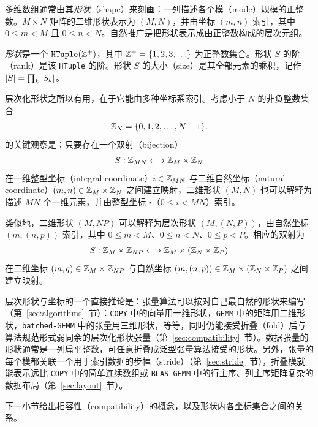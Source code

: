 \label{sec:shape}

多维数组通常由其\emph{形状}（shape）来刻画：一列描述各个模（mode）规模的正整数。$M{\times}N$ 矩阵的二维形状表示为 $(M,N)$，并由坐标 $(m,n)$ 索引，其中 $0 \leq m < M$ 且 $0 \leq n < N$。自然推广是把形状表示成由正整数构成的层次元组。

\begin{definition}
\emph{形状}是一个 $\texttt{HTuple}(\mathbb{Z}^+)$，其中 $\mathbb{Z}^+ = \{1,2,3,\ldots\}$ 为正整数集合。形状 $S$ 的阶（rank）是该 \texttt{HTuple} 的阶。形状 $S$ 的大小（size）是其全部元素的乘积，记作 $\left| {S} \right| = \prod_k \left| {S_k} \right|$。
\end{definition}

层次化形状之所以有用，在于它能由多种坐标系索引。考虑小于 $N$ 的非负整数集合
\begin{align*}
\mathbb{Z}_N = \{ 0, 1, 2, \ldots, N-1 \}.
\end{align*}
\CuTe 的关键观察是：只要存在一个双射（bijection）
\begin{align*}
S : \mathbb{Z}_{MN} \longleftrightarrow \mathbb{Z}_M \times \mathbb{Z}_N
\end{align*}
在一维整型坐标（integral coordinate）$i \in \mathbb{Z}_{MN}$ 与二维自然坐标（natural coordinate）$(m,n) \in \mathbb{Z}_M \times \mathbb{Z}_N$ 之间建立映射，二维形状 $(M,N)$ 也可以解释为描述 $MN$ 个一维元素，并由整型坐标 $i$（$0 \leq i < MN$）索引。

类似地，二维形状 $(M,NP)$ 可以解释为层次形状 $(M,(N,P))$，由自然坐标 $(m,(n,p))$ 索引，其中 $0 \leq m < M$、$0 \leq n < N$、$0 \leq p < P$。相应的双射为
\begin{align*}
S : \mathbb{Z}_M \times \mathbb{Z}_{NP} \longleftrightarrow \mathbb{Z}_M \times (\mathbb{Z}_N \times \mathbb{Z}_P)
\end{align*}
在二维坐标 $(m,q) \in \mathbb{Z}_M \times \mathbb{Z}_{NP}$ 与自然坐标 $(m,(n,p)) \in \mathbb{Z}_M \times (\mathbb{Z}_N \times \mathbb{Z}_P)$ 之间建立映射。

层次形状与坐标的一个直接推论是：张量算法可以按对自己最自然的形状来编写（第~\ref{sec:algorithms}~节）：{\tt COPY} 中的向量用一维形状，{\tt GEMM} 中的矩阵用二维形状，{\tt batched-GEMM} 中的张量用三维形状，等等，同时仍能接受折叠（fold）后与算法规范形式弱同余的层次化形状张量（第~\ref{sec:compatibility}~节）。数据张量的形状通常是一列扁平整数，可任意折叠成泛型张量算法接受的形状。另外，张量的每个模都关联一个用于索引数据的步幅（stride）（第~\ref{sec:stride}~节），折叠模就能表示远比 {\tt COPY} 中的简单连续数组或 {\tt BLAS GEMM} 中的行主序、列主序矩阵复杂的数据布局（第~\ref{sec:layout}~节）。

下一小节给出相容性（compatibility）的概念，以及形状内各坐标集合之间的关系。

